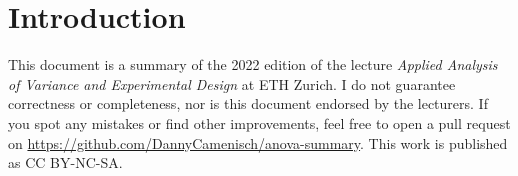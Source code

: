 \section{Introduction}

This document is a summary of the 2022 edition of the lecture \textit{Applied Analysis of Variance and Experimental Design} at ETH Zurich. I do not guarantee correctness or completeness, nor is this document endorsed by the lecturers. If you spot any mistakes or find other improvements, feel free to open a pull request on \url{https://github.com/DannyCamenisch/anova-summary}. This work is published as CC BY-NC-SA.
\begin{center}
	\ccbyncsa
\end{center}

